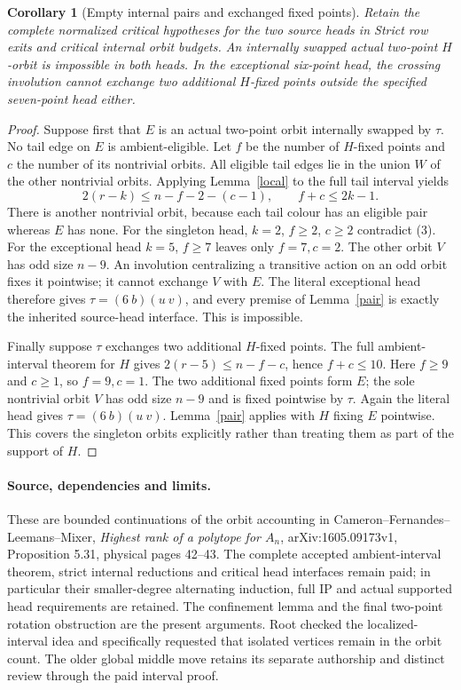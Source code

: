 \documentclass[11pt,a4paper]{article}
\newtheorem{corollary}[lemma]{Corollary}
\begin{document}
\begin{corollary}[Empty internal pairs and exchanged fixed points]
Retain the complete normalized critical hypotheses for the two
source heads in \emph{Strict row exits and critical internal orbit
budgets}. An internally swapped actual two-point $H$-orbit is
impossible in both heads. In the exceptional six-point head,
the crossing involution cannot exchange two additional $H$-fixed
points outside the specified seven-point head either.
\end{corollary}
\begin{proof}
Suppose first that $E$ is an actual two-point orbit internally
swapped by $\tau$. No tail edge on $E$ is ambient-eligible.
Let $f$ be the number of $H$-fixed points and $c$ the number
of its nontrivial orbits. All eligible tail edges lie in the
union $W$ of the other nontrivial orbits. Applying
Lemma~\ref{local} to the full tail interval yields
\[
  2(r-k)\le n-f-2-(c-1),\qquad f+c\le2k-1.             \tag{3}
\]
There is another nontrivial orbit, because each tail colour has
an eligible pair whereas $E$ has none. For the singleton head,
$k=2$, $f\ge2$, $c\ge2$ contradict (3).
For the exceptional head $k=5$, $f\ge7$ leaves only $f=7,c=2$.
The other orbit $V$ has odd size $n-9$.
An involution centralizing a transitive action on an odd orbit
fixes it pointwise; it cannot exchange $V$ with $E$.
The literal exceptional head therefore gives
$\tau=(6\ b)(u\ v)$, and every premise of Lemma~\ref{pair}
is exactly the inherited source-head interface. This is impossible.

Finally suppose $\tau$ exchanges two additional $H$-fixed points.
The full ambient-interval theorem for $H$ gives
$2(r-5)\le n-f-c$, hence $f+c\le10$.
Here $f\ge9$ and $c\ge1$, so $f=9,c=1$.
The two additional fixed points form $E$; the sole nontrivial
orbit $V$ has odd size $n-9$ and is fixed pointwise by $\tau$.
Again the literal head gives $\tau=(6\ b)(u\ v)$.
Lemma~\ref{pair} applies with $H$ fixing $E$ pointwise.
This covers the singleton orbits explicitly rather than treating
them as part of the support of $H$.
\end{proof}

\paragraph{Source, dependencies and limits.}
These are bounded continuations of the orbit accounting in
Cameron--Fernandes--Leemans--Mixer, \emph{Highest rank of a polytope
for $A_n$}, arXiv:1605.09173v1, Proposition 5.31, physical
pages 42--43. The complete accepted ambient-interval theorem,
strict internal reductions and critical head interfaces remain
paid; in particular their smaller-degree alternating induction,
full IP and actual supported head requirements are retained.
The confinement lemma and the final two-point rotation obstruction
are the present arguments. Root checked the localized-interval
idea and specifically requested that isolated vertices remain in
the orbit count. The older global middle move retains its separate
authorship and distinct review through the paid interval proof.
\end{document}
